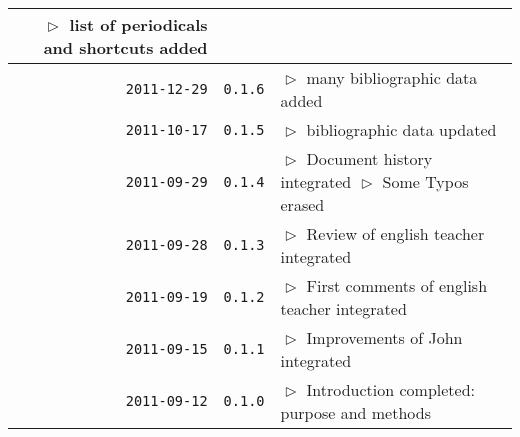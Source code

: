 \begin{table}
\begin{center}
\begin{tabular}{|r|c|p{10cm}|}
  $\vartriangleright$ list of periodicals and shortcuts added\\
\hline
    \texttt{2011-12-29}
  & \texttt{0.1.6} 
  & $\vartriangleright$ many bibliographic data added\\
\hline
    \texttt{2011-10-17}
  & \texttt{0.1.5} 
  & $\vartriangleright$ bibliographic data updated\\
\hline
    \texttt{2011-09-29}
  & \texttt{0.1.4} 
  & $\vartriangleright$ Document history integrated\newline
    $\vartriangleright$ Some Typos erased\\
\hline
    \texttt{2011-09-28}
  & \texttt{0.1.3} 
  & $\vartriangleright$ Review of english teacher integrated \\
\hline
    \texttt{2011-09-19}
  & \texttt{0.1.2} 
  & $\vartriangleright$ First comments of english teacher integrated \\
\hline
    \texttt{2011-09-15}
  & \texttt{0.1.1} 
  & $\vartriangleright$ Improvements of John integrated\\
\hline
    \texttt{2011-09-12}
  & \texttt{0.1.0} 
  & $\vartriangleright$ Introduction completed: purpose and methods \\
\hline
\hline 
\end{tabular}
\end{center}
\end{table}


%
